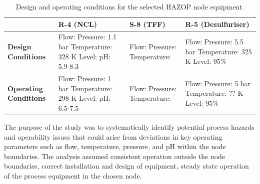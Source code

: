 \begin{table}[htbp]
    \centering
    \caption{Design and operating conditions for the selected HAZOP node equipment.}
    \label{tab:hazop_design_operating_conditions}
    \footnotesize
    \begin{tabularx}{\textwidth}{|>{\raggedright\arraybackslash}p{}|>{\raggedright\arraybackslash}X|>{\raggedright\arraybackslash}X|>{\raggedright\arraybackslash}X|}
        \hline
        \textbf{}                     & \textbf{R-4 (NCL)} & \textbf{S-8 (TFF)} & \textbf{R-5 (Desulfuriser)} \\
        \hline
        \textbf{Design Conditions}    &
        Flow:\newline
        Pressure: 1.1 bar\newline
        Temperature: 328 K\newline
        Level:\newline
        pH: 5.9-8.3                   &
        Flow:\newline
        Pressure:\newline
        Temperature:                  &
        Flow:\newline
        Pressure: 5.5 bar\newline
        Temperature: 325 K\newline
        Level: 95\%                                                                                           \\
        \hline
        \textbf{Operating Conditions} &
        Flow:\newline
        Pressure: 1 bar\newline
        Temperature: 298 K\newline
        Level:\newline
        pH: 6.5-7.5                   &
        Flow:\newline
        Pressure:\newline
        Temperature:                  &
        Flow:\newline
        Pressure: 5 bar\newline
        Temperature: ?? K\newline
        Level: 95\%                                                                                           \\
        \hline
    \end{tabularx}
    \normalsize
\end{table}

The purpose of the study was to systematically identify potential process hazards and operability issues that could arise from deviations in key operating parameters such as flow, temperature, pressure, and pH within the node boundaries. The analysis assumed consistent operation outside the node boundaries, correct installation and design of equipment, steady state operation of the process equipment in the chosen node.

